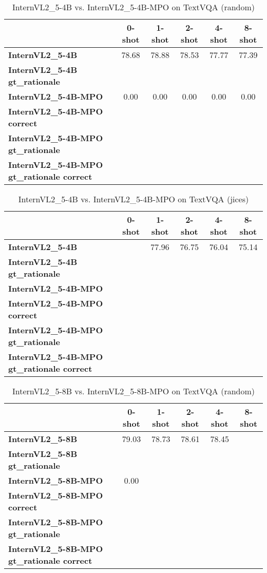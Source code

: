 \begin{table}
\caption{InternVL2\_5-4B vs. InternVL2\_5-4B-MPO on TextVQA (random)}
\label{tab:InternVL2_5-4B_TextVQA_TRAIN_random}
\begin{tabular}{lccccc}
\toprule
 & 0-shot & 1-shot & 2-shot & 4-shot & 8-shot \\
\midrule
\textbf{InternVL2\_5-4B} & 78.68 & 78.88 & 78.53 & 77.77 & 77.39 \\
\textbf{InternVL2\_5-4B gt\_rationale} &  &  &  &  &  \\
\textbf{InternVL2\_5-4B-MPO} & 0.00 & 0.00 & 0.00 & 0.00 & 0.00 \\
\textbf{InternVL2\_5-4B-MPO correct} &  &  &  &  &  \\
\textbf{InternVL2\_5-4B-MPO gt\_rationale} &  &  &  &  &  \\
\textbf{InternVL2\_5-4B-MPO gt\_rationale correct} &  &  &  &  &  \\
\bottomrule
\end{tabular}
\end{table}


\begin{table}
\caption{InternVL2\_5-4B vs. InternVL2\_5-4B-MPO on TextVQA (jices)}
\label{tab:InternVL2_5-4B_TextVQA_TRAIN_jices}
\begin{tabular}{lccccc}
\toprule
 & 0-shot & 1-shot & 2-shot & 4-shot & 8-shot \\
\midrule
\textbf{InternVL2\_5-4B} &  & 77.96 & 76.75 & 76.04 & 75.14 \\
\textbf{InternVL2\_5-4B gt\_rationale} &  &  &  &  &  \\
\textbf{InternVL2\_5-4B-MPO} &  &  &  &  &  \\
\textbf{InternVL2\_5-4B-MPO correct} &  &  &  &  &  \\
\textbf{InternVL2\_5-4B-MPO gt\_rationale} &  &  &  &  &  \\
\textbf{InternVL2\_5-4B-MPO gt\_rationale correct} &  &  &  &  &  \\
\bottomrule
\end{tabular}
\end{table}


\begin{table}
\caption{InternVL2\_5-8B vs. InternVL2\_5-8B-MPO on TextVQA (random)}
\label{tab:InternVL2_5-8B_TextVQA_TRAIN_random}
\begin{tabular}{lccccc}
\toprule
 & 0-shot & 1-shot & 2-shot & 4-shot & 8-shot \\
\midrule
\textbf{InternVL2\_5-8B} & 79.03 & 78.73 & 78.61 & 78.45 &  \\
\textbf{InternVL2\_5-8B gt\_rationale} &  &  &  &  &  \\
\textbf{InternVL2\_5-8B-MPO} & 0.00 &  &  &  &  \\
\textbf{InternVL2\_5-8B-MPO correct} &  &  &  &  &  \\
\textbf{InternVL2\_5-8B-MPO gt\_rationale} &  &  &  &  &  \\
\textbf{InternVL2\_5-8B-MPO gt\_rationale correct} &  &  &  &  &  \\
\bottomrule
\end{tabular}
\end{table}


